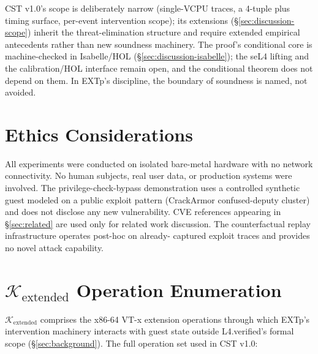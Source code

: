\documentclass[conference]{IEEEtran}
\newcommand{\Kextended}{\mathcal{K}_\text{extended}}
\begin{document}
CST v1.0's scope is deliberately narrow (single-VCPU traces, a
4-tuple plus timing surface, per-event intervention scope); its
extensions (\S\ref{sec:discussion-scope}) inherit the
threat-elimination structure and require extended empirical
antecedents rather than new soundness machinery. The proof's
conditional core is machine-checked in Isabelle/HOL
(\S\ref{sec:discussion-isabelle}); the seL4 lifting and the
calibration/HOL interface remain open, and the conditional theorem
does not depend on them. In EXTp's discipline, the boundary of
soundness is named, not avoided.

\section*{Ethics Considerations}

All experiments were conducted on isolated bare-metal hardware with
no network connectivity. No human subjects, real user data, or
production systems were involved. The privilege-check-bypass
demonstration uses a controlled synthetic guest modeled on a public
exploit pattern (CrackArmor confused-deputy cluster) and does not
disclose any new vulnerability. CVE references appearing in
\S\ref{sec:related} are used only for related work discussion. The
counterfactual replay infrastructure operates post-hoc on already-
captured exploit traces and provides no novel attack capability.




\appendices

\section{\texorpdfstring{$\Kextended$}{K-extended} Operation Enumeration}\label{app:kextended}

$\Kextended$ comprises the x86-64 VT-x extension operations
through which EXTp's intervention machinery interacts with guest
state outside L4.verified's formal scope (\S\ref{sec:background}).
The full operation set used in CST v1.0:
\end{document}
